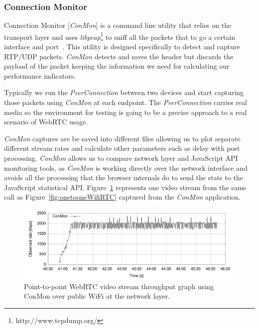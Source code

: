 \subsubsection{Connection Monitor}

Connection Monitor [{\it ConMon}] is a command line utility that relies on the transport layer and uses {\it libpcap}\footnote{http://www.tcpdump.org/} to sniff all the packets that to go a certain interface and port~\cite{singhConMon}. This utility is designed specifically to detect and capture RTP/UDP packets. {\it ConMon} detects and saves the header but discards the payload of the packet keeping the information we need for calculating our performance indicators.

Typically we run the {\it PeerConnection} between two devices and start capturing those packets using {\it ConMon} at each endpoint. The {\it PeerConnection} carries real media so the environment for testing is going to be a precise approach to a real scenario of WebRTC usage.

{\it ConMon} captures are be saved into different files allowing us to plot separate different stream rates and calculate other parameters such as delay with post processing. {\it ConMon} allows us to compare network layer and JavaScript API monitoring tools, as {\it ConMon} is working directly over the network interface and avoids all the processing that the browser internals do to send the stats to the JavaScript statistical API. Figure~\ref{fig:onetooneWifiRTCConMon} represents one video stream from the same call as Figure~\ref{fig:onetooneWifiRTC} captured from the {\it ConMon} application.

 \begin{figure}[h]
  \centering
    \includegraphics[width=1\textwidth]{./figures/onetooneWiFiConMon.pdf}
      \caption[Point-to-point WebRTC video stream throughput graph using ConMon over public WiFi at the network layer]{Point-to-point WebRTC video stream throughput graph using ConMon over public WiFi at the network layer.}
	\label{fig:onetooneWifiRTCConMon}
\end{figure}

